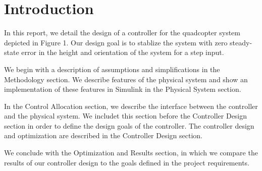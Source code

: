 \section*{Introduction}
In this report, we detail the design of a controller for the quadcopter system depicted in Figure 1. Our design goal is to stablize the system with zero steady-state error in the height and orientation of the system for a step input. %

We begin with a description of assumptions and simplifications in the Methodology section. We describe features of the physical system and show an implementation of these features in Simulink in the Physical System section.

In the Control Allocation section, we describe the interface between the controller and the physical system. We includet this section before the Controller Design section in order to define the design goals of the controller. The controller design and optimization are described in the Controller Design section.

We conclude with the Optimization and Results section, in which we compare the results of our controller design to the goals defined in the project requirements.